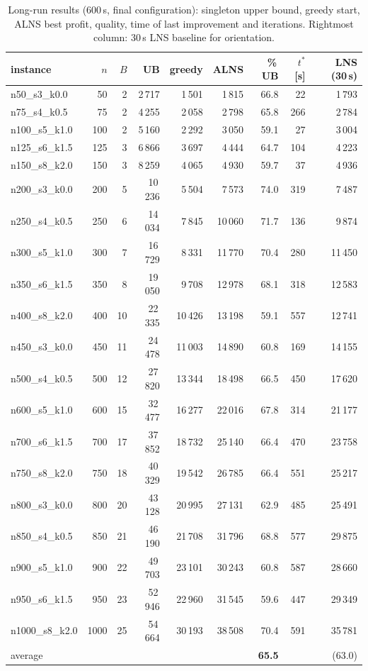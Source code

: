 \documentclass[10pt, a4paper]{article}
\newcommand{\ub}{\%\,UB}
\begin{document}
\begin{table}[t]
\centering\small
\caption{Long-run results (600\,s, final configuration): singleton upper
bound, greedy start, ALNS best profit, quality, time of last improvement
and iterations. Rightmost column: 30\,s LNS baseline for orientation.}
\label{tab:final}
\begin{tabular}{lrrrrrrrr}
\toprule
instance & $n$ & $B$ & UB & greedy & ALNS & \ub & $t^{*}$[s] & LNS (30\,s) \\
\midrule
n50\_s3\_k0.0   &   50 &  2 &  2\,717 &  1\,501 &  1\,815 & 66.8 &  22 &  1\,793 \\
n75\_s4\_k0.5   &   75 &  2 &  4\,255 &  2\,058 &  2\,798 & 65.8 & 266 &  2\,784 \\
n100\_s5\_k1.0  &  100 &  2 &  5\,160 &  2\,292 &  3\,050 & 59.1 &  27 &  3\,004 \\
n125\_s6\_k1.5  &  125 &  3 &  6\,866 &  3\,697 &  4\,444 & 64.7 & 104 &  4\,223 \\
n150\_s8\_k2.0  &  150 &  3 &  8\,259 &  4\,065 &  4\,930 & 59.7 &  37 &  4\,936 \\
n200\_s3\_k0.0  &  200 &  5 & 10\,236 &  5\,504 &  7\,573 & 74.0 & 319 &  7\,487 \\
n250\_s4\_k0.5  &  250 &  6 & 14\,034 &  7\,845 & 10\,060 & 71.7 & 136 &  9\,874 \\
n300\_s5\_k1.0  &  300 &  7 & 16\,729 &  8\,331 & 11\,770 & 70.4 & 280 & 11\,450 \\
n350\_s6\_k1.5  &  350 &  8 & 19\,050 &  9\,708 & 12\,978 & 68.1 & 318 & 12\,583 \\
n400\_s8\_k2.0  &  400 & 10 & 22\,335 & 10\,426 & 13\,198 & 59.1 & 557 & 12\,741 \\
n450\_s3\_k0.0  &  450 & 11 & 24\,478 & 11\,003 & 14\,890 & 60.8 & 169 & 14\,155 \\
n500\_s4\_k0.5  &  500 & 12 & 27\,820 & 13\,344 & 18\,498 & 66.5 & 450 & 17\,620 \\
n600\_s5\_k1.0  &  600 & 15 & 32\,477 & 16\,277 & 22\,016 & 67.8 & 314 & 21\,177 \\
n700\_s6\_k1.5  &  700 & 17 & 37\,852 & 18\,732 & 25\,140 & 66.4 & 470 & 23\,758 \\
n750\_s8\_k2.0  &  750 & 18 & 40\,329 & 19\,542 & 26\,785 & 66.4 & 551 & 25\,217 \\
n800\_s3\_k0.0  &  800 & 20 & 43\,128 & 20\,995 & 27\,131 & 62.9 & 485 & 25\,491 \\
n850\_s4\_k0.5  &  850 & 21 & 46\,190 & 21\,708 & 31\,796 & 68.8 & 577 & 29\,875 \\
n900\_s5\_k1.0  &  900 & 22 & 49\,703 & 23\,101 & 30\,243 & 60.8 & 587 & 28\,660 \\
n950\_s6\_k1.5  &  950 & 23 & 52\,946 & 22\,960 & 31\,545 & 59.6 & 447 & 29\,349 \\
n1000\_s8\_k2.0 & 1000 & 25 & 54\,664 & 30\,193 & 38\,508 & 70.4 & 591 & 35\,781 \\
\midrule
average &&&&&& \textbf{65.5} && (63.0) \\
\bottomrule
\end{tabular}
\end{table}
\end{document}
